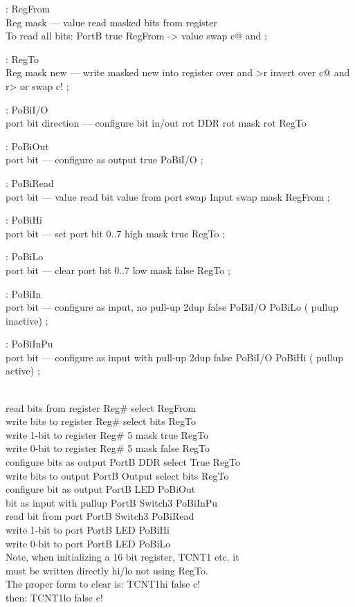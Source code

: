 \documentclass[10pt,english]{article}
\begin{document}
: RegFrom \\ Reg mask --- value  read masked bits from register
        \\ To read all bits:  PortB true RegFrom -> value
     swap c@  and ;

: RegTo \\ Reg mask new ---  write masked new into register
     over and >r   invert over c@ and   r> or  swap c! ;

: PoBiI/O  \\ port bit direction --- configure bit in/out
    rot DDR   rot mask   rot RegTo 

: PoBiOut  \\ port bit --- configure as output
    true  PoBiI/O ;

: PoBiRead  \\ port bit --- value  read bit value from port
     swap Input swap mask RegFrom ;

: PoBiHi  \\ port bit --- set port bit 0..7 high
     mask true  RegTo ;

: PoBiLo   \\ port bit --- clear port bit 0..7 low
     mask false RegTo ;

: PoBiIn   \\ port bit --- configure as input,  no pull-up
    2dup false PoBiI/O   PoBiLo ( pullup inactive) ;

: PoBiInPu \\ port bit --- configure as input with pull-up
    2dup false PoBiI/O   PoBiHi ( pullup active) ;

\\ read bits from register  Reg#         select      RegFrom
\\ write bits to register   Reg#         select bits RegTo
\\ write 1-bit to register  Reg#   5 mask true       RegTo
\\ write 0-bit to register  Reg#   5 mask false      RegTo
\\ configure bits as output PortB DDR    select True RegTo
\\ write bits to output     PortB Output select bits RegTo
\\ configure bit as output  PortB     LED            PoBiOut
\\ bit as input with pullup PortB     Switch3        PoBiInPu
\\ read bit from port       PortB     Switch3        PoBiRead
\\ write 1-bit to port      PortB     LED            PoBiHi
\\ write 0-bit to port      PortB     LED            PoBiLo
\\ Note, when initializing a 16 bit register, TCNT1 etc. it
\\  must be written directly hi/lo not using RegTo.
\\  The proper form to clear is:    TCNT1hi false c!
\\                         then:    TCNT1lo false c!
\\                                  
\end{document}
